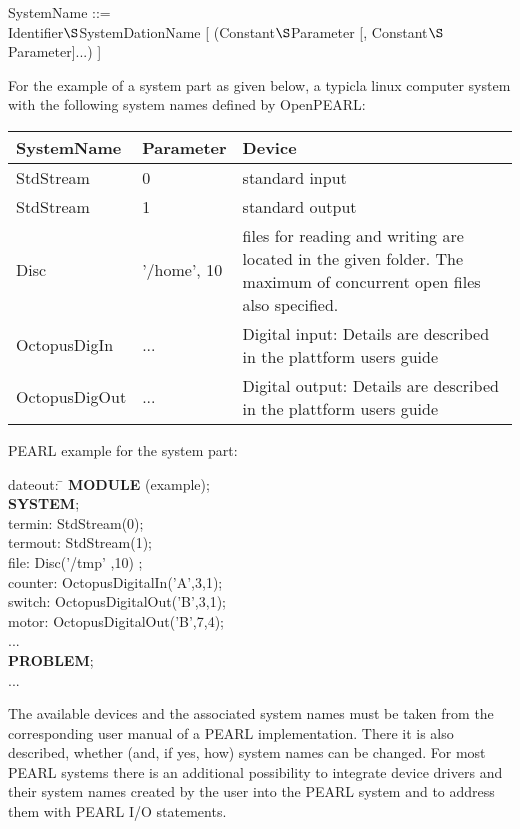 \begin{added}
SystemName ::=\\
\x Identifier$\S $SystemDationName [ (Constant$\S $Parameter [, Constant$\S $Parameter]...) ]

For the example of a system part as given below, a typicla linux computer
system with the following system names defined by OpenPEARL:

\begin{tabular}{ll@{\x}p{6cm}}
SystemName & Parameter & Device \\ \hline
StdStream  &  0 & standard input \\
StdStream  &  1 & standard output \\
Disc       & '/home', 10 & files for reading and writing are located in the given folder. The maximum of concurrent open files also specified. \\
OctopusDigIn & ... & Digital input: Details are described in the plattform users guide \\
OctopusDigOut & ... & Digital output: Details are described in the plattform users guide \\
\end{tabular}

PEARL example for the system part:

\begin{tabbing}
\x dateout: \= \kill
{\bf MODULE} (example); \> \\
{\bf SYSTEM}; \> \\
\x termin:  \> StdStream(0); \\
\x termout: \> StdStream(1);\\
\x file:    \> Disc('/tmp' ,10) ;  \\
\x counter: \> OctopusDigitalIn('A',3,1); \\
\x switch:  \> OctopusDigitalOut('B',3,1); \\
\x motor:   \> OctopusDigitalOut('B',7,4); \\
\x ... \> \\
{\bf PROBLEM};\> \\
\x ... \>
\end{tabbing}

\end{added}

The available devices and the associated system names must be taken from
the corresponding user manual of a PEARL implementation. There it is
also described, whether (and, if yes, how) system names can be changed.
For most PEARL systems there is an additional possibility to integrate
device drivers and their system names created by the user into the PEARL
system and to address them with PEARL I/O statements.

